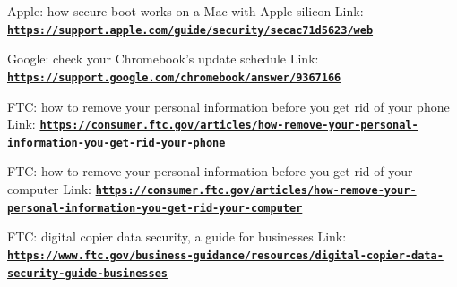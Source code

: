\documentclass[12pt]{article}
\begin{document}
Apple: how secure boot works on a Mac with Apple silicon
Link: \href{https://support.apple.com/guide/security/secac71d5623/web}{\textbf{\nolinkurl{https://support.apple.com/guide/security/secac71d5623/web}}}

Google: check your Chromebook's update schedule
Link: \href{https://support.google.com/chromebook/answer/9367166}{\textbf{\nolinkurl{https://support.google.com/chromebook/answer/9367166}}}

FTC: how to remove your personal information before you get rid of your phone
Link: \href{https://consumer.ftc.gov/articles/how-remove-your-personal-information-you-get-rid-your-phone}{\textbf{\nolinkurl{https://consumer.ftc.gov/articles/how-remove-your-personal-information-you-get-rid-your-phone}}}

FTC: how to remove your personal information before you get rid of your computer
Link: \href{https://consumer.ftc.gov/articles/how-remove-your-personal-information-you-get-rid-your-computer}{\textbf{\nolinkurl{https://consumer.ftc.gov/articles/how-remove-your-personal-information-you-get-rid-your-computer}}}

FTC: digital copier data security, a guide for businesses
Link: \href{https://www.ftc.gov/business-guidance/resources/digital-copier-data-security-guide-businesses}{\textbf{\nolinkurl{https://www.ftc.gov/business-guidance/resources/digital-copier-data-security-guide-businesses}}}
\end{document}
